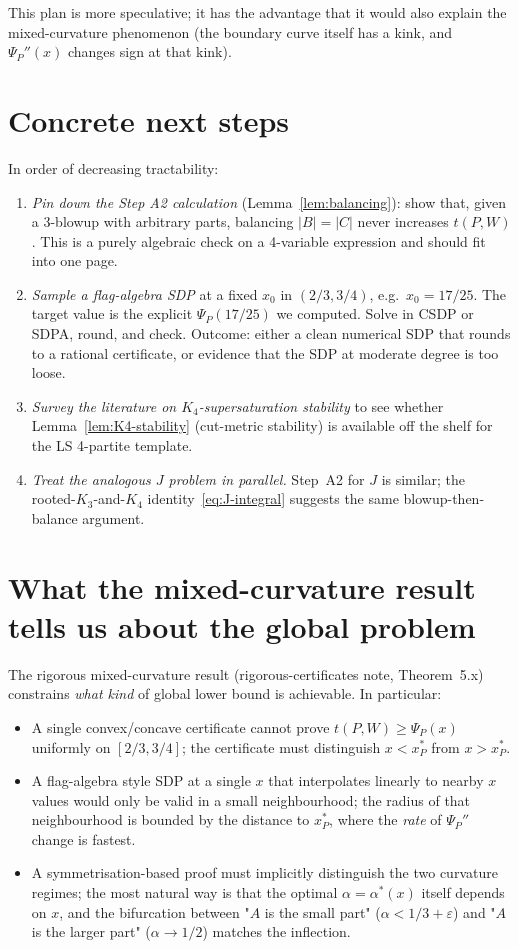 \documentclass[11pt]{amsart}
\theoremstyle{definition}
\begin{document}
This plan is more speculative; it has the advantage that it would also explain
the mixed-curvature phenomenon (the boundary curve itself has a kink, and
$\Psi_P''(x)$ changes sign at that kink).

\section{Concrete next steps}

In order of decreasing tractability:

\begin{enumerate}[label=\textbf{Task \arabic*.},itemsep=4pt]
\item \emph{Pin down the Step A2 calculation} (Lemma~\ref{lem:balancing}):
show that, given a 3-blowup with arbitrary parts, balancing $|B|=|C|$ never
increases $t(P,W)$.  This is a purely algebraic check on a 4-variable
expression and should fit into one page.
\item \emph{Sample a flag-algebra SDP} at a fixed $x_0$ in $(2/3,3/4)$, e.g.\
$x_0 = 17/25$.  The target value is the explicit $\Psi_P(17/25)$ we computed.
Solve in CSDP or SDPA, round, and check.  Outcome: either a clean numerical
SDP that rounds to a rational certificate, or evidence that the SDP at
moderate degree is too loose.
\item \emph{Survey the literature on $K_4$-supersaturation stability} to see
whether Lemma~\ref{lem:K4-stability} (cut-metric stability) is available off
the shelf for the LS 4-partite template.
\item \emph{Treat the analogous $J$ problem in parallel.}  Step~A2 for $J$ is
similar; the rooted-$K_3$-and-$K_4$ identity~\eqref{eq:J-integral} suggests
the same blowup-then-balance argument.
\end{enumerate}

\section{What the mixed-curvature result tells us about the global problem}

The rigorous mixed-curvature result (rigorous-certificates note,
Theorem~5.x) constrains \emph{what kind} of global lower bound is achievable.
In particular:

\begin{itemize}[itemsep=2pt]
\item A single convex/concave certificate cannot prove
$t(P,W)\ge\Psi_P(x)$ uniformly on $[2/3,3/4]$; the certificate must
distinguish $x<x^*_P$ from $x>x^*_P$.
\item A flag-algebra style SDP at a single $x$ that interpolates linearly to
nearby $x$ values would only be valid in a small neighbourhood; the radius of
that neighbourhood is bounded by the distance to $x^*_P$, where the
\emph{rate} of $\Psi_P''$ change is fastest.
\item A symmetrisation-based proof must implicitly distinguish the two
curvature regimes; the most natural way is that the optimal $\alpha=\alpha^*(x)$
itself depends on $x$, and the bifurcation between "$A$ is the small part"
($\alpha<1/3+\varepsilon$) and "$A$ is the larger part" ($\alpha\to 1/2$)
matches the inflection.
\end{itemize}
\end{document}
